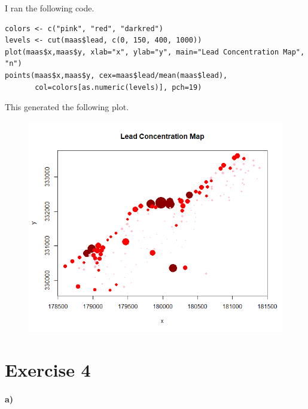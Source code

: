 \documentclass[12pt]{article}
\begin{document}
I ran the following code.
\scriptsize
\begin{verbatim}
colors <- c("pink", "red", "darkred")
levels <- cut(maas$lead, c(0, 150, 400, 1000))
plot(maas$x,maas$y, xlab="x", ylab="y", main="Lead Concentration Map", "n")
points(maas$x,maas$y, cex=maas$lead/mean(maas$lead),
       col=colors[as.numeric(levels)], pch=19)
\end{verbatim}
\normalsize
This generated the following plot.
\begin{figure}[H]
    \begin{center}
        \includegraphics[width=4.5in]{exercise3d.png}
    \end{center}
\end{figure}

\section*{Exercise 4}

\paragraph{a)}
\end{document}
